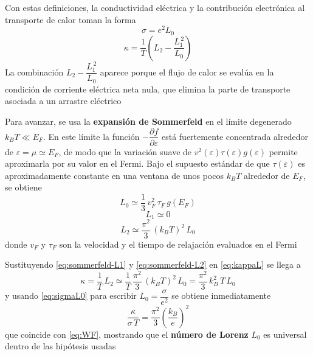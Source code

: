 \documentclass{article}
\begin{document}
Con estas definiciones, la conductividad eléctrica y la contribución electrónica al transporte de calor toman la forma
\begin{equation}\label{eq:sigmaL0}
\sigma = e^{2} L_0
\end{equation}
\begin{equation}\label{eq:kappaL}
\kappa = \frac{1}{T}\left(L_2-\frac{L_1^{\,2}}{L_0}\right)
\end{equation}
La combinación $L_2-\dfrac{L_1^{\,2}}{L_0}$ aparece porque el flujo de calor se evalúa en la condición de corriente eléctrica neta nula, que elimina la parte de transporte asociada a un arrastre eléctrico

Para avanzar, se usa la \textcolor{Cerulean}{\textbf{expansión de Sommerfeld}} en el límite degenerado $k_B T \ll E_F$. En este límite la función $-\dfrac{\partial f}{\partial \varepsilon}$ está fuertemente concentrada alrededor de $\varepsilon=\mu\simeq E_F$, de modo que la variación suave de $v^2(\varepsilon)\tau(\varepsilon)g(\varepsilon)$ permite aproximarla por su valor en el Fermi. Bajo el supuesto estándar de que $\tau(\varepsilon)$ es aproximadamente constante en una ventana de unos pocos $k_B T$ alrededor de $E_F$, se obtiene
\begin{equation}\label{eq:sommerfeld-L0}
L_0 \simeq \frac{1}{3}\,v_F^{2}\,\tau_F\,g(E_F)
\end{equation}
\begin{equation}\label{eq:sommerfeld-L1}
L_1 \simeq 0
\end{equation}
\begin{equation}\label{eq:sommerfeld-L2}
L_2 \simeq \frac{\pi^{2}}{3}\,(k_B T)^{2}\,L_0
\end{equation}
donde $v_F$ y $\tau_F$ son la velocidad y el tiempo de relajación evaluados en el Fermi

Sustituyendo \eqref{eq:sommerfeld-L1} y \eqref{eq:sommerfeld-L2} en \eqref{eq:kappaL} se llega a
\begin{equation}\label{eq:kappa-final}
\kappa = \frac{1}{T}\,L_2 \simeq \frac{1}{T}\,\frac{\pi^{2}}{3}\,(k_B T)^{2}\,L_0
= \frac{\pi^{2}}{3}\,k_B^{2}\,T\,L_0
\end{equation}
y usando \eqref{eq:sigmaL0} para escribir $L_0=\dfrac{\sigma}{e^{2}}$ se obtiene inmediatamente
\begin{equation}\label{eq:WF-derivada}
\frac{\kappa}{\sigma\,T}=\frac{\pi^{2}}{3}\left(\frac{k_B}{e}\right)^{2}
\end{equation}
que coincide con \eqref{eq:WF}, mostrando que el \textcolor{Cerulean}{\textbf{número de Lorenz}} $L_0$ es universal dentro de las hipótesis usadas
\end{document}
